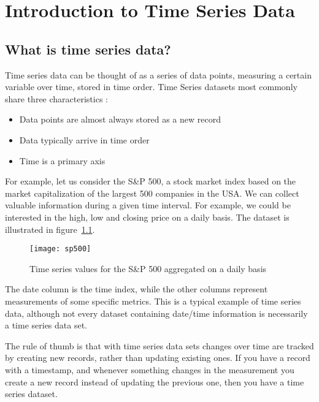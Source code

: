 


\chapter{Introduction to Time Series Data}

\section{What is time series data?}
Time series data can be thought of as a series of data points, measuring a certain variable over time, stored in time order. Time Series datasets most commonly share three characteristics \cite{AjayKulkarni2018What} :
\begin{itemize}
	\item Data points are almost always stored as a new record\par
	\item Data typically arrive in time order\par
	\item Time is a primary axis
\end{itemize}

For example, let us consider the S\&P 500, a stock market index based on the market capitalization of the largest 500 companies in the USA. We can collect valuable information during a given time interval. For example, we could be interested in the high, low and closing price on a daily basis. The dataset is illustrated in figure~\ref{sp500}.

\begin{figure}
\begin{center}
\texttt{[image: sp500]}
\caption[sp500]{Time series values for the S\&P 500 aggregated on a daily basis}
\label{sp500}
\end{center}
\end{figure}

The date column is the time index, while the other columns represent measurements of some specific metrics. This is a typical example of time series data, although not every dataset containing date/time information is necessarily a time series data set.

The rule of thumb is that with time series data sets changes over time are tracked by creating new records, rather than updating existing ones. If you have a record with a timestamp, and whenever something changes in the measurement you create a new record instead of updating the previous one, then you have a time series dataset.


